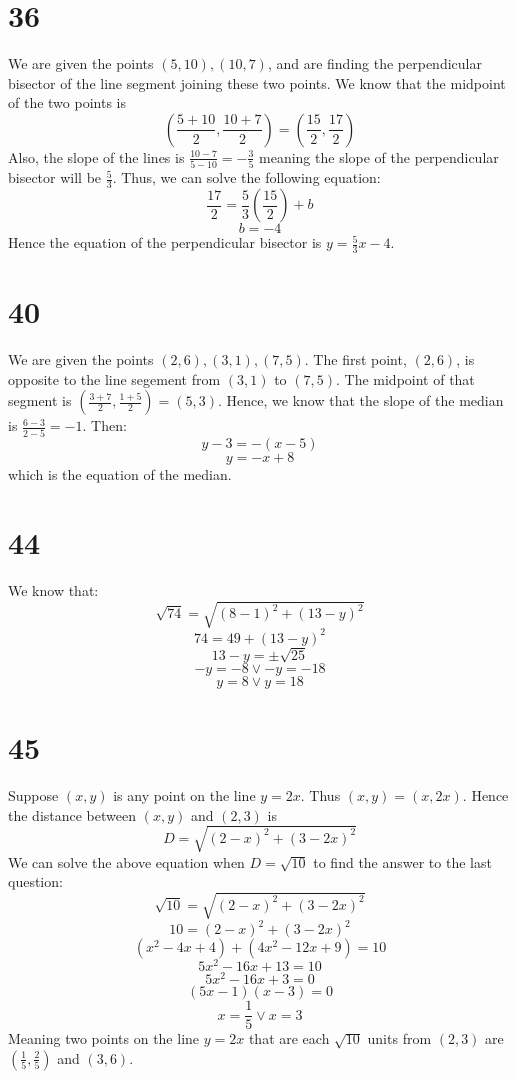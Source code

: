 \documentclass{article}
\theoremstyle{definition}
\newcommand{\?}{\stackrel{?}{=}}
\begin{document}
\section*{36}
We are given the points $(5,10),(10,7)$, and are finding the perpendicular bisector of the line segment joining these two points. 
We know that the midpoint of the two points is \[ (\frac{5+10}{2},\frac{10+7}{2})=(\frac{15}{2},\frac{17}{2}) \]
Also, the slope of the lines is $\frac{10-7}{5-10}=-\frac{3}{5}$ meaning the slope of the perpendicular bisector will be 
$\frac{5}{3}$. Thus, we can solve the following equation:
\[ \frac{17}{2}=\frac{5}{3}(\frac{15}{2})+b \]
\[ b=-4 \]
Hence the equation of the perpendicular bisector is $y=\frac{5}{3}x-4$.

\section*{40}
We are given the points $(2,6),(3,1),(7,5)$. The first point, $(2,6)$, is opposite to the line segement from $(3,1)$ to $(7,5)$. 
The midpoint of that segment is $(\frac{3+7}{2},\frac{1+5}{2})=(5,3)$. Hence, we know that the slope of the median is 
$\frac{6-3}{2-5}=-1$. Then:
\[ y-3=-(x-5) \]
\[ y=-x+8 \] which is the equation of the median.

\section*{44}
We know that:
\[ \sqrt{74}=\sqrt{(8-1)^2+(13-y)^2} \]
\[ 74=49+(13-y)^2 \]
\[ 13-y=\pm\sqrt{25} \]
\[ -y=-8\vee -y=-18 \] \[ y=8\vee y=18 \]

\section*{45}
Suppose $(x,y)$ is any point on the line $y=2x$. Thus $(x,y)=(x,2x)$. Hence the distance between $(x,y)$ and $(2,3)$ is
\[ D=\sqrt{(2-x)^2+(3-2x)^2} \]
We can solve the above equation when $D=\sqrt{10}$ to find the answer to the last question:
\[ \sqrt{10}=\sqrt{(2-x)^2+(3-2x)^2} \]
\[ 10=(2-x)^2+(3-2x)^2 \]
\[ (x^2-4x+4)+(4x^2-12x+9)=10 \]
\[ 5x^2-16x+13=10 \]
\[ 5x^2-16x+3=0 \]
\[ (5x-1)(x-3)=0 \]
\[ x=\frac{1}{5}\vee x=3 \]
Meaning two points on the line $y=2x$ that are each $\sqrt{10}$ units from $(2,3)$ are 
$(\frac{1}{5},\frac{2}{5})$ and $(3,6)$.
\end{document}
